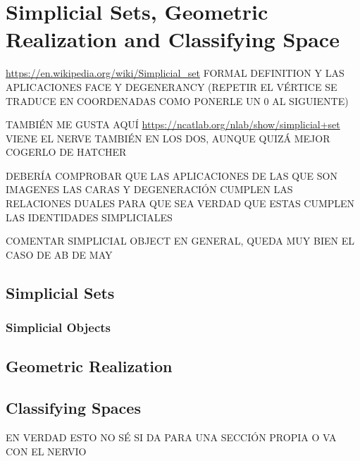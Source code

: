 \documentclass[TFM.tex]{subfiles}
\begin{document}
\chapter{Simplicial Sets, Geometric Realization and Classifying Space}

\url{https://en.wikipedia.org/wiki/Simplicial_set} FORMAL DEFINITION Y LAS APLICACIONES FACE Y DEGENERANCY (REPETIR EL VÉRTICE SE TRADUCE EN COORDENADAS COMO PONERLE UN 0 AL SIGUIENTE)

TAMBIÉN ME GUSTA AQUÍ \url{https://ncatlab.org/nlab/show/simplicial+set} VIENE EL NERVE TAMBIÉN EN LOS DOS, AUNQUE QUIZÁ MEJOR COGERLO DE HATCHER


DEBERÍA COMPROBAR QUE LAS APLICACIONES DE LAS QUE SON IMAGENES LAS CARAS Y DEGENERACIÓN CUMPLEN LAS RELACIONES DUALES PARA QUE SEA VERDAD QUE ESTAS CUMPLEN LAS IDENTIDADES SIMPLICIALES


COMENTAR SIMPLICIAL OBJECT EN GENERAL, QUEDA MUY BIEN EL CASO DE AB DE MAY


\section{Simplicial Sets}
\begin{ej}
\end{ej}
\subsection{Simplicial Objects}

\section{Geometric Realization}

\section{Classifying Spaces}
EN VERDAD ESTO NO SÉ SI DA PARA UNA SECCIÓN PROPIA O VA CON EL NERVIO 
\end{document}
